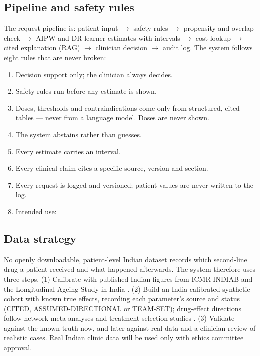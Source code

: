\subsection{Pipeline and safety rules}
The request pipeline is: patient input $\rightarrow$ safety rules $\rightarrow$ propensity and overlap check $\rightarrow$ AIPW and DR-learner estimates with intervals $\rightarrow$ cost lookup $\rightarrow$ cited explanation (RAG) $\rightarrow$ clinician decision $\rightarrow$ audit log. The system follows eight rules that are never broken:
\begin{enumerate}
\item Decision support only; the clinician always decides.
\item Safety rules run before any estimate is shown.
\item Doses, thresholds and contraindications come only from structured, cited tables --- never from a language model. Doses are never shown.
\item The system abstains rather than guesses.
\item Every estimate carries an interval.
\item Every clinical claim cites a specific source, version and section.
\item Every request is logged and versioned; patient values are never written to the log.
\item Intended use: \intendeduse
\end{enumerate}

\subsection{Data strategy}
No openly downloadable, patient-level Indian dataset records which second-line drug a patient received and what happened afterwards. The system therefore uses three steps. (1) Calibrate with published Indian figures from ICMR-INDIAB \cite{anjana2023} and the Longitudinal Ageing Study in India \cite{lasi2020}. (2) Build an India-calibrated synthetic cohort with known true effects, recording each parameter's source and status (CITED, ASSUMED-DIRECTIONAL or TEAM-SET); drug-effect directions follow network meta-analyses \cite{tsapas2020,palmer2016} and treatment-selection studies \cite{dennis2022,shields2023,gudemann2025}. (3) Validate against the known truth now, and later against real data and a clinician review of realistic cases. Real Indian clinic data will be used only with ethics committee approval.
